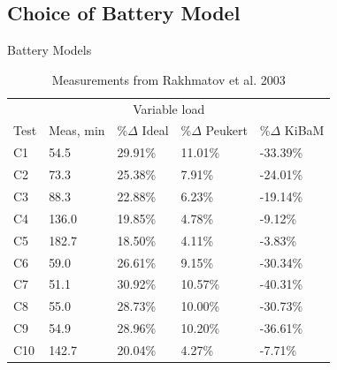 \subsection{Choice of Battery Model}
\begin{frame}[fragile]{Battery Models}{\insertsubsection}
\begin{table}[]
	\centering
	\begin{tabular}{lllll}
		\multicolumn{5}{c}{Variable load} \\
		\rowcolor[HTML]{EFEFEF} 
		Test & Meas, min & \%$\Delta$ Ideal & \%$\Delta$ Peukert & \%$\Delta$ KiBaM \\
		C1 & 54.5 & 29.91\% & 11.01\% & -33.39\% \\
		\rowcolor[HTML]{EFEFEF} 
		C2 & 73.3 & 25.38\% & 7.91\% & -24.01\% \\
		C3 & 88.3 & 22.88\% & 6.23\% & -19.14\% \\
		\rowcolor[HTML]{EFEFEF} 
		C4 & 136.0 & 19.85\% & 4.78\% & -9.12\% \\
		C5 & 182.7 & 18.50\% & 4.11\% & -3.83\% \\
		\rowcolor[HTML]{EFEFEF} 
		C6 & 59.0 & 26.61\% & 9.15\% & -30.34\% \\
		C7 & 51.1 & 30.92\% & 10.57\% & -40.31\% \\
		\rowcolor[HTML]{EFEFEF} 
		C8 & 55.0 & 28.73\% & 10.00\% & -30.73\% \\
		C9 & 54.9 & 28.96\% & 10.20\% & -36.61\% \\
		\rowcolor[HTML]{EFEFEF} 
		C10 & 142.7 & 20.04\% & 4.27\% & -7.71\%
	\end{tabular}
	\caption{Measurements from Rakhmatov et al. 2003}
\end{table}
\end{frame}

